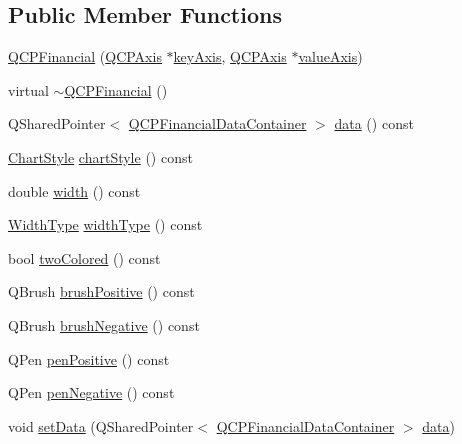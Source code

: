 \subsection*{Public Member Functions}
\begin{DoxyCompactItemize}
\item 
\mbox{\hyperlink{class_q_c_p_financial_a4702d5248feeb9d1ec6e3ce725b10b32}{Q\+C\+P\+Financial}} (\mbox{\hyperlink{class_q_c_p_axis}{Q\+C\+P\+Axis}} $\ast$\mbox{\hyperlink{class_q_c_p_abstract_plottable_a2cdd6f0dd5e9a979037f86b4000d9cfe}{key\+Axis}}, \mbox{\hyperlink{class_q_c_p_axis}{Q\+C\+P\+Axis}} $\ast$\mbox{\hyperlink{class_q_c_p_abstract_plottable_af47809a644a68ffd955fb30b01fb4f2f}{value\+Axis}})
\item 
virtual \mbox{\hyperlink{class_q_c_p_financial_ad1fda0d793797b66819fac4682b10f31}{$\sim$\+Q\+C\+P\+Financial}} ()
\item 
Q\+Shared\+Pointer$<$ \mbox{\hyperlink{qcustomplot_8h_ae36e482e04f19a54782f01ab38c354a6}{Q\+C\+P\+Financial\+Data\+Container}} $>$ \mbox{\hyperlink{class_q_c_p_financial_aec3f666271cf48bd7b87d84fe3f8c074}{data}} () const
\item 
\mbox{\hyperlink{class_q_c_p_financial_a0f800e21ee98d646dfc6f8f89d10ebfb}{Chart\+Style}} \mbox{\hyperlink{class_q_c_p_financial_a5243371c1fde30fdae00555d7760ec2d}{chart\+Style}} () const
\item 
double \mbox{\hyperlink{class_q_c_p_financial_a12548f13658eda5833204ef60f524870}{width}} () const
\item 
\mbox{\hyperlink{class_q_c_p_financial_aef1761dda71a53dc5269685e9e492626}{Width\+Type}} \mbox{\hyperlink{class_q_c_p_financial_a7afa595e63800c072701e6e57d4ca9e2}{width\+Type}} () const
\item 
bool \mbox{\hyperlink{class_q_c_p_financial_afd4b51de5be8e53776b649f9877a50e6}{two\+Colored}} () const
\item 
Q\+Brush \mbox{\hyperlink{class_q_c_p_financial_ae922e75f3d5b8854369ac0bf1ebfb053}{brush\+Positive}} () const
\item 
Q\+Brush \mbox{\hyperlink{class_q_c_p_financial_ad4fdc5bc21f5eb17070e043bd4a35f53}{brush\+Negative}} () const
\item 
Q\+Pen \mbox{\hyperlink{class_q_c_p_financial_ae803fe25fdd6f0acacde4539590795ed}{pen\+Positive}} () const
\item 
Q\+Pen \mbox{\hyperlink{class_q_c_p_financial_a25d9a8f256e5ddcba56b6e2e7e968653}{pen\+Negative}} () const
\item 
void \mbox{\hyperlink{class_q_c_p_financial_a72089e75b8a50d18097526c3c79fdb85}{set\+Data}} (Q\+Shared\+Pointer$<$ \mbox{\hyperlink{qcustomplot_8h_ae36e482e04f19a54782f01ab38c354a6}{Q\+C\+P\+Financial\+Data\+Container}} $>$ \mbox{\hyperlink{class_q_c_p_financial_aec3f666271cf48bd7b87d84fe3f8c074}{data}})

\end{DoxyCompactItemize}
